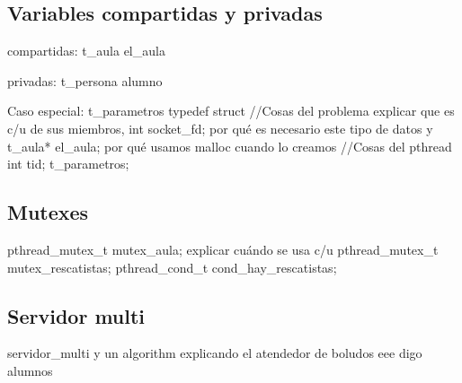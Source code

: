\subsection{Variables compartidas y privadas}
compartidas: t_aula el_aula

privadas: t_persona alumno

Caso especial: t_parametros 
typedef struct {
	//Cosas del problema			explicar que es c/u de sus miembros,
	int socket_fd;				por qué es necesario este tipo de datos y
	t_aula* el_aula;			por qué usamos malloc cuando lo creamos
	//Cosas del pthread
	int tid;
} t_parametros;

\subsection{Mutexes}
pthread_mutex_t mutex_aula;			explicar cuándo se usa c/u
pthread_mutex_t mutex_rescatistas;
pthread_cond_t cond_hay_rescatistas;

\subsection{Servidor multi} %
servidor_multi y un algorithm explicando el atendedor de boludos eee digo alumnos 
